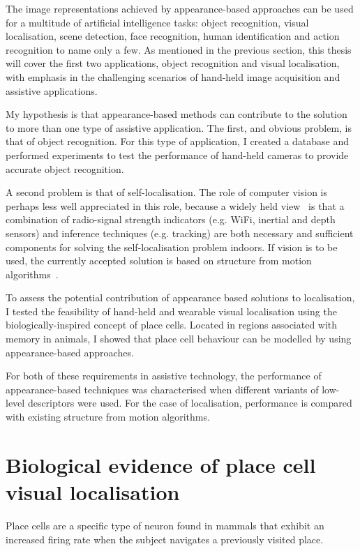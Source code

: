 The image representations achieved by appearance-based approaches can be used for a multitude of artificial intelligence tasks: object recognition, visual localisation, scene detection, face recognition, human identification and action recognition to name only a few. As mentioned in the previous section, this thesis will cover the first two applications, object recognition and visual localisation, with emphasis in the challenging scenarios of hand-held image acquisition and assistive applications. 

My hypothesis is that appearance-based methods can contribute to the solution to more than one type of assistive application. The first, and obvious problem, is that of object recognition. 
For this type of application, I created a database and performed experiments to test the performance of hand-held cameras to provide accurate object recognition. 

A second problem is that of self-localisation. The role of computer vision is perhaps less well appreciated in this role, because a widely held view~\cite{wang2012no} is that a combination of  radio-signal strength indicators (e.g. WiFi, inertial and depth sensors) and inference techniques (e.g. tracking) are both necessary and sufficient components for solving the self-localisation problem indoors. If vision is to be used, the currently accepted solution is based on structure from motion algorithms~\cite{engel14eccv}. 

To assess the potential contribution of appearance based solutions to localisation, I tested the feasibility of hand-held and wearable visual localisation using the biologically-inspired concept of place cells. Located in regions associated with memory in animals, I showed that place cell behaviour can be modelled by using appearance-based approaches.  

For both of these requirements in assistive technology, the performance of appearance-based techniques was characterised when different variants of low-level descriptors were used.  For the case of localisation, performance is compared with existing structure from motion algorithms.

\section{Biological evidence of place cell visual localisation} 

Place cells are a specific type of neuron found in mammals that exhibit an increased firing rate when the subject navigates a previously visited place.

